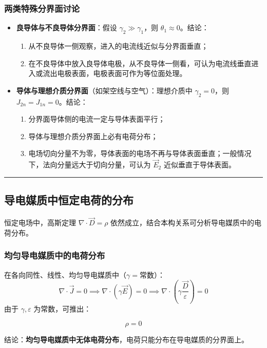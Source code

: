 \subsubsection{两类特殊分界面讨论}
\begin{itemize}
    \item \textbf{良导体与不良导体分界面}：假设 $\gamma_2 \gg \gamma_1$，则 $\theta_1 \approx 0$。结论：
    \begin{enumerate}
        \item 从不良导体一侧观察，进入的电流线近似与分界面垂直；
        \item 在不良导体中放入良导体电极，从不良导体一侧看，可认为电流线垂直进入或流出电极表面，电极表面可作为等位面处理。
    \end{enumerate}

    \item \textbf{导体与理想介质分界面}（如架空线与空气）：理想介质中 $\gamma_2=0$，则 $J_{2n}=J_{1n}=0$。结论：
    \begin{enumerate}
        \item 分界面导体侧的电流一定与导体表面平行；
        \item 导体与理想介质分界面上必有电荷分布；
        \item 电场切向分量不为零，导体表面的电场不再与导体表面垂直；一般情况下，法向分量远大于切向分量，可认为 $\vec{E}_2$ 近似垂直于导体表面。
    \end{enumerate}
\end{itemize}

\vspace{0.8cm}\hrule\vspace{0.8cm}

\subsection{导电媒质中恒定电荷的分布}
恒定电场中，高斯定理 $\nabla \cdot \vec{D} = \rho$ 依然成立，结合本构关系可分析导电媒质中的电荷分布。

\subsubsection{均匀导电媒质中的电荷分布}
在各向同性、线性、均匀导电媒质中（$\gamma = \text{常数}$）：
\[
\nabla \cdot \vec{J} = 0 \implies \nabla \cdot (\gamma \vec{E}) = 0 \implies \nabla \cdot \left( \gamma \frac{\vec{D}}{\varepsilon} \right) = 0
\]
由于 $\gamma, \varepsilon$ 为常数，可推出：
\begin{formulaBox}
\[
\rho = 0
\]
\end{formulaBox}
结论：\textbf{均匀导电媒质中无体电荷分布}，电荷只能分布在导电媒质的分界面上。

